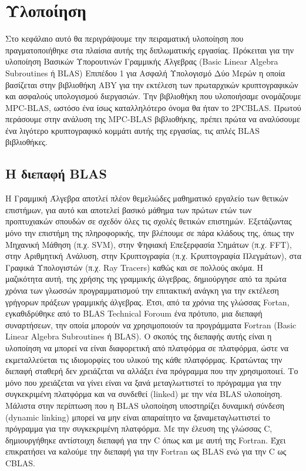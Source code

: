 \chapter{Υλοποίηση}
\label{chapter:implementation}

Στο κεφάλαιο αυτό θα περιγράψουμε την πειραματική υλοποίηση που πραγματοποιήθηκε στα πλαίσια αυτής της διπλωματικής εργασίας. Πρόκειται για την υλοποίηση Βασικών Υπορουτινών Γραμμικής Άλγεβρας (Basic Linear Algebra Subroutines ή BLAS) Επιπέδου 1 για Ασφαλή Υπολογισμό Δύο Μερών η οποία βασίζεται στην βιβλιοθήκη ABY για την εκτέλεση των πρωταρχικών κρυπτογραφικών και ασφαλούς υπολογισμού διεργασιών. Την βιβλιοθήκη που υλοποιήσαμε ονομάζουμε MPC-BLAS, ωστόσο ένα ίσως καταλληλότερο όνομα θα ήταν το 2PCBLAS. Πρωτού περάσουμε στην ανάλυση της MPC-BLAS βιβλιοθήκης, πρέπει πρώτα να αναλύσουμε  ένα λιγότερο κρυπτογραφικό κομμάτι αυτής της εργασίας, τις απλές BLAS βιβλιοθήκες.

\section{Η διεπαφή BLAS}

Η Γραμμική Άλγεβρα αποτλεί πλέον θεμελιώδες μαθηματικό εργαλείο των θετικών επιστήμων, για αυτό και αποτελεί βασικό μάθημα των πρώτων ετών των προπτυχιακών σπουδών σε σχεδόν όλες τις σχολές θετικών επιστημών. Εξετάζωντας μόνο την επιστήμη της πληροφορικής, την βλέπουμε σε πάρα κλάδους της, όπως την Μηχανική Μάθηση (π.χ. SVM), στην Ψηφιακή Επεξερφασία Σημάτων (π.χ. FFT), στην Αριθμητική Ανάλυση, στην Κρυπτογραφία (π.χ. Κρυπτογραφία Πλεγμάτων), στα Γραφικά Υπολογιστών (π.χ. Ray Tracers) καθώς και σε πολλούς ακόμα.
Η μαζικότητα αυτή, της χρήσης της γραμμικής άλγεβρας, δημιούργησε από τα πρώτα χρόνια των γλωσσών προγραμματισμού την επιτακτική ανάγκη για την εκτέλεση γρήγορων πράξεων γραμμικής άλγεβρας. Έτσι, από τα χρόνια της γλώσσας Fortan, εγκαθιδρύθηκε από το BLAS Technical Foroum ένα πρότυπο, μια διεπαφή συναρτήσεων, την οποία μπορούν να χρησιμοποιούν τα προγράμματα Fortran (Basic Linear Algebra Subroutines ή BLAS). Ο σκοπός της διεπαφής αυτής είναι η υλοποίηση να μπορεί να είναι διαφορετική
από πλατφόρμα σε πλατφόρμα, ώστε να εκμεταλλεύεται τις ιδιομορφίες του υλικού της κάθε πλατφόρμας. Κρατώντας την διεπαφή σταθερή δεν χρειάζεται να αλλάξει ένα πρόγραμμα που την χρησιμοποιεί. Το μόνο που χρειάζεται να γίνει είναι να ξανά μεταγλωττιστεί το πρόγραμμα για την συγκεκριμένη πλατφόρμα και να συνδεθεί (linked) με την νέα BLAS υλοποίηση. Μάλιστα στην περίπτωση που η BLAS υλοποίηση υποστηρίζει δυναμική σύνδεση (dynamic linking) μπορεί να μην είναι απαραίτητο να ξαναμεταγλωττιστεί το πρόγραμμα για την συγκεκριμένη πλατφόρμα. Με την έλευση της γλώσσας C, δημιουργήθηκε αντίστοιχη διεπαφή για την C όπως και με αυτή της Fortran. Έχει επικρατήσει να καλούμε την διεπαφή για την Fortran ως BLAS ενώ για την C ως CBLAS.

